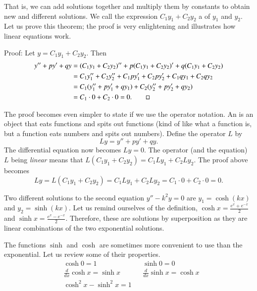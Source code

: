 \documentclass[12pt]{book}
\begin{document}
That is, we can add solutions together and multiply them by constants to
obtain new and different solutions.  We call
the expression $C_1 y_1 + C_2 y_2$ a
\emph{} of $y_1$ and $y_2$.
Let us
prove this theorem; the
proof is very enlightening and illustrates how linear equations work.

\medskip

Proof:
Let 
$y = C_1 y_1 + C_2 y_2$.  Then
\begin{equation*}
\begin{split}
y'' + py' + qy & =
(C_1 y_1 + C_2 y_2)'' + p(C_1 y_1 + C_2 y_2)' + q(C_1 y_1 + C_2 y_2) \\
& = C_1 y_1'' + C_2 y_2'' + C_1 p y_1' + C_2 p y_2' + C_1 q y_1 + C_2 q y_2 \\
& = C_1 ( y_1'' + p y_1' + q y_1 ) + C_2 ( y_2'' + p y_2' + q y_2 ) \\
& = C_1 \cdot 0 + C_2 \cdot 0 = 0 . \qed
\end{split}
\end{equation*}

\medskip

The proof becomes even simpler to state if we use the
operator notation.
An \emph{} is an object that eats functions and spits out functions (kind of
like what a function is, but a function eats numbers and spits out numbers).
Define the operator $L$ by
\begin{equation*}
Ly = y'' + py' + qy .
\end{equation*}
The differential equation now becomes $Ly=0$.
The operator (and the equation)
$L$ being \emph{linear} means that $L(C_1y_1 + C_2y_2) = 
C_1 Ly_1 + C_2 Ly_2$.  The proof above becomes
\begin{equation*}
Ly = L(C_1y_1 + C_2y_2) = 
C_1 Ly_1 + C_2 Ly_2 = C_1 \cdot 0 + C_2 \cdot 0 = 0 .
\end{equation*}

\medskip

Two different solutions to the second equation $y'' - k^2y = 0$ are
$y_1 = \cosh (kx)$ and $y_2 = \sinh (kx)$.  Let us remind ourselves of the
definition, $\cosh x = \frac{e^x  + e^{-x}}{2}$ and
$\sinh x = \frac{e^x - e^{-x}}{2}$.  Therefore, these are solutions by
superposition as they
are linear combinations of the two
exponential solutions.

The functions $\sinh$ and $\cosh$ are sometimes more convenient to use than the
exponential.  Let us review some of their properties.
\begin{align*}
& \cosh 0  = 1 &   & \sinh 0 = 0 \\
& \frac{d}{dx} \cosh x = \sinh x &  & \frac{d}{dx} \sinh x = \cosh x \\
& \cosh^2 x - \sinh^2 x = 1
\end{align*}
\end{document}
